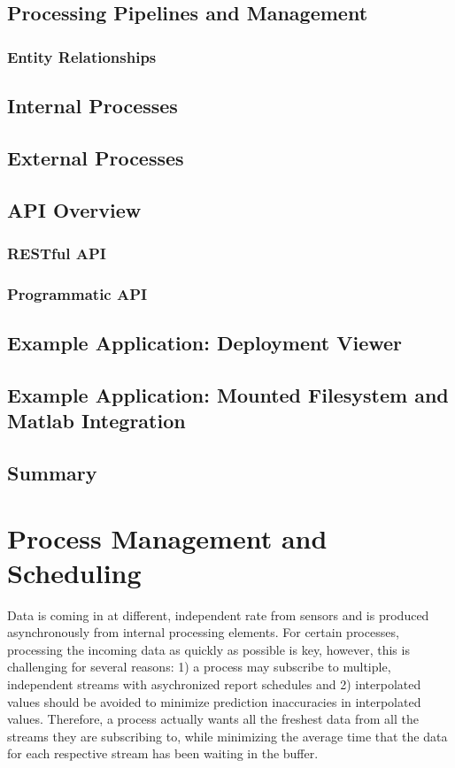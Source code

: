 \section{Processing Pipelines and Management}
	\subsection{Entity Relationships}
\section{Internal Processes}
\section{External Processes}
\section{API Overview}
	\subsection{RESTful API}
	\subsection{Programmatic API}
\section{Example Application: Deployment Viewer}
\section{Example Application: Mounted Filesystem and Matlab Integration}
\section{Summary}


\chapter{Process Management and Scheduling}
Data is coming in at different, independent rate from sensors and is produced asynchronously from internal processing elements.
For certain processes, processing the incoming data as quickly as possible is key, however, this is challenging for several reasons:
1) a process may subscribe to multiple, independent streams with asychronized report schedules and 2) interpolated values
should be avoided to minimize prediction inaccuracies in interpolated values.  Therefore, a process actually wants all the freshest
data from all the streams they are subscribing to, while minimizing the average time that the data for each respective stream has 
been waiting in the buffer.


